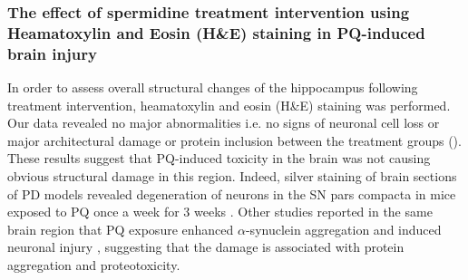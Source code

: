 \subsubsection{The effect of spermidine treatment intervention using Heamatoxylin and Eosin (H\&E) staining in PQ-induced brain injury}
In order to assess overall structural changes of the hippocampus following treatment intervention, heamatoxylin and eosin (H\&E) staining was performed. Our data revealed no major abnormalities i.e. no signs of neuronal cell loss or major architectural damage or protein inclusion between the treatment groups (). These results suggest that PQ-induced toxicity in the brain was not causing obvious structural damage in this region. Indeed, silver staining of brain sections of PD models revealed degeneration of neurons in the SN pars compacta in mice exposed to PQ once a week for 3 weeks \citep{McCormack2002}. Other studies reported in the same brain region that PQ exposure enhanced $\alpha$-synuclein aggregation \citep{Manning-Bog2002} and induced neuronal injury \citep{Manning-Bog2003}, suggesting that the damage is associated with protein aggregation and proteotoxicity.

